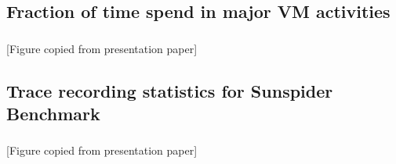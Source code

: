\documentclass[mathserif,10pt]{beamer}
\begin{document}
\subsection{Fraction of time spend in major VM activities}
\frame
{
  \frametitle{\subsecname}
  \begin{figure}[h]
  \centering
  \end{figure}
  [Figure copied from presentation paper]
}

\subsection{Trace recording statistics for Sunspider Benchmark}
\frame
{
  \frametitle{\subsecname}
  \begin{figure}[h]
  \centering
  \end{figure}
  [Figure copied from presentation paper]
}
\end{document}

